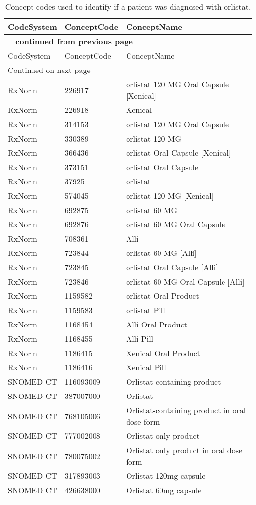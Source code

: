 \begin{longtable}{p{}p{}p{}}
\caption{Concept codes used to identify if a patient was diagnosed with orlistat.} \\ 
 CodeSystem & ConceptCode & ConceptName \\ 
  \hline 
\endfirsthead 
\multicolumn{3}{p{\textwidth}}{{ \bfseries \tablename \thetable{} -- continued from previous page}} \\ 
\hline CodeSystem & ConceptCode & ConceptName \\ \hline 
\endhead 
\hline \multicolumn{3}{p{\textwidth}}{{Continued on next page}} \\ \hline 
\endfoot 
\hline 
\endlastfoot 
 \hline
RxNorm & 226917 & orlistat 120 MG Oral Capsule [Xenical] \\ 
  RxNorm & 226918 & Xenical \\ 
  RxNorm & 314153 & orlistat 120 MG Oral Capsule \\ 
  RxNorm & 330389 & orlistat 120 MG \\ 
  RxNorm & 366436 & orlistat Oral Capsule [Xenical] \\ 
  RxNorm & 373151 & orlistat Oral Capsule \\ 
  RxNorm & 37925 & orlistat \\ 
  RxNorm & 574045 & orlistat 120 MG [Xenical] \\ 
  RxNorm & 692875 & orlistat 60 MG \\ 
  RxNorm & 692876 & orlistat 60 MG Oral Capsule \\ 
  RxNorm & 708361 & Alli \\ 
  RxNorm & 723844 & orlistat 60 MG [Alli] \\ 
  RxNorm & 723845 & orlistat Oral Capsule [Alli] \\ 
  RxNorm & 723846 & orlistat 60 MG Oral Capsule [Alli] \\ 
  RxNorm & 1159582 & orlistat Oral Product \\ 
  RxNorm & 1159583 & orlistat Pill \\ 
  RxNorm & 1168454 & Alli Oral Product \\ 
  RxNorm & 1168455 & Alli Pill \\ 
  RxNorm & 1186415 & Xenical Oral Product \\ 
  RxNorm & 1186416 & Xenical Pill \\ 
  SNOMED CT & 116093009 & Orlistat-containing product \\ 
  SNOMED CT & 387007000 & Orlistat \\ 
  SNOMED CT & 768105006 & Orlistat-containing product in oral dose form \\ 
  SNOMED CT & 777002008 & Orlistat only product \\ 
  SNOMED CT & 780075002 & Orlistat only product in oral dose form \\ 
  SNOMED CT & 317893003 & Orlistat 120mg capsule \\ 
  SNOMED CT & 426638000 & Orlistat 60mg capsule \\ 
  \hline
\label{tab:codes_orlistat}
\end{longtable}
